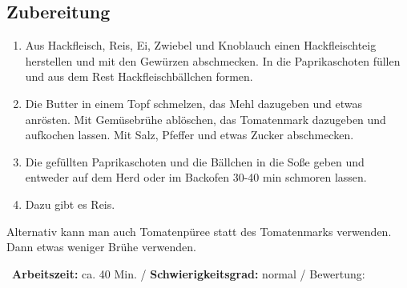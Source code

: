 \begin{minipage}[t]{0.58\textwidth}
\vspace{0pt}
\subsection*{Zubereitung}
\begin{enumerate}[leftmargin=*, itemindent=14pt]
\item Aus Hackfleisch, Reis, Ei, Zwiebel und Knoblauch einen Hackfleischteig herstellen und mit den Gewürzen abschmecken. In die Paprikaschoten füllen und aus dem Rest Hackfleischbällchen formen.
\item Die Butter in einem Topf schmelzen, das Mehl dazugeben und etwas anrösten. Mit Gemüsebrühe ablöschen, das Tomatenmark dazugeben und aufkochen lassen. Mit Salz, Pfeffer und etwas Zucker abschmecken. 
\item Die gefüllten Paprikaschoten und die Bällchen in die Soße geben und entweder auf dem Herd oder im Backofen 30-40 min schmoren lassen.
\item Dazu gibt es Reis. 
\end{enumerate}
Alternativ kann man auch Tomatenpüree statt des Tomatenmarks verwenden. Dann etwas weniger Brühe verwenden.
\end{minipage}
\vfill
\decothreeright \, \textbf{Arbeitszeit:} ca. 40 Min.	 / \textbf{Schwierigkeitsgrad:} normal	 / \decothreeleft \hfill Bewertung: \CIRCLE \CIRCLE \CIRCLE \CIRCLE \LEFTcircle